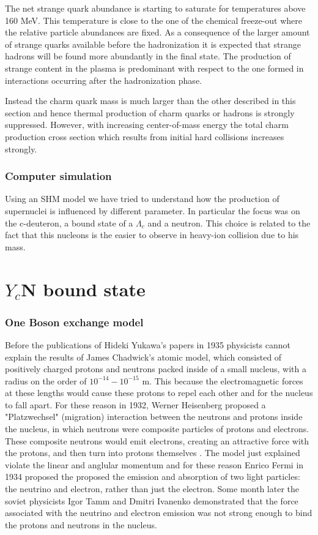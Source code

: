 \documentclass[12pt,a4paper]{book}
\begin{document}
	The net strange quark abundance is starting to saturate for temperatures above 160 MeV. This temperature is close to the one of the chemical freeze-out where the relative particle abundances are fixed. As a consequence of the larger amount of strange quarks available before the hadronization it is expected that strange hadrons will be found more abundantly in the final state. The production of strange content in the plasma is predominant with respect to the one formed in interactions occurring after the hadronization	phase. 
	
	Instead the charm quark mass is much larger than the other described in this section and hence thermal production of charm quarks or hadrons is strongly suppressed. However, with increasing center-of-mass energy the total charm production cross section which results from initial hard collisions increases strongly. 
	\subsection{Computer simulation}
	Using an SHM model we have tried to understand how the production of supernuclei is influenced by different parameter. In particular the focus was on the c-deuteron, a bound state of a $\Lambda_c$ and a neutron. This choice is related to the fact that this nucleons is the easier to observe in heavy-ion collision due to his mass.    
	
	
	
	\FloatBarrier
	\chapter{$Y_c$N bound state}
	
	\subsection{One Boson exchange model}
	Before the publications of Hideki Yukawa's papers in 1935 \cite{yukawa} physicists cannot explain the results of James Chadwick's atomic model, which consisted of positively charged protons and neutrons packed inside of a small nucleus, with a radius on the order of $10^{-14}-10^{-15}$ m. This because the electromagnetic forces at these lengths would cause these protons to repel each other and for the nucleus to fall apart. For these reason in 1932, Werner Heisenberg proposed a "Platzwechsel" (migration) interaction between the neutrons and protons inside the nucleus, in which neutrons were composite particles of protons and electrons. These composite neutrons would emit electrons, creating an attractive force with the protons, and then turn into protons themselves \cite{heisemerg}. The model just explained violate the linear and anglular momentum and for these reason Enrico Fermi in 1934 proposed the  proposed the emission and absorption of two light particles: the neutrino and electron, rather than just the electron. Some month later the soviet physicists Igor Tamm and Dmitri Ivanenko demonstrated that the force associated with the neutrino and electron emission was not strong enough to bind the protons and neutrons in the nucleus.
	
\end{document}
